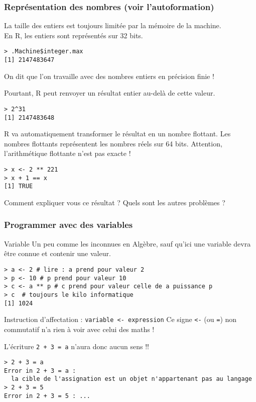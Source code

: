 \documentclass[10pt]{beamer}
\begin{document}
\begin{frame}[fragile]
  \frametitle{Représentation des nombres (voir l'autoformation)}
  \alert{La taille} des entiers \alert{est toujours limitée par} la mémoire de \alert{la machine}. \\
  En R, les entiers sont représentés sur 32 bits.
\begin{lstlisting}
> .Machine$integer.max
[1] 2147483647
\end{lstlisting}
On dit que l'on travaille avec des nombres entiers en \alert{précision finie} !

Pourtant, R peut renvoyer un résultat entier au-delà de cette valeur.
\begin{lstlisting}
> 2^31
[1] 2147483648
\end{lstlisting}
R va automatiquement transformer le résultat en un \alert{nombre flottant}.
Les nombres flottants représentent les nombres réels sur 64 bits.
Attention, l’arithmétique flottante n’est pas exacte !
\begin{lstlisting}
> x <- 2 ** 221
> x + 1 == x
[1] TRUE  
\end{lstlisting}
 Comment expliquer vous ce résultat ? Quels sont les autres problèmes ?
\end{frame}



\begin{frame}[fragile]
  \frametitle{Programmer avec des variables}
  \begin{alertblock}{Variable}
    Un peu comme les \alert{inconnues} en Algèbre, sauf qu'ici une variable devra être \alert{connue} et contenir une valeur.
  \end{alertblock}
      \begin{lstlisting}
> a <- 2 # lire : a prend pour valeur 2
> p <- 10 # p prend pour valeur 10
> c <- a ** p # c prend pour valeur celle de a puissance p
> c  # toujours le kilo informatique
[1] 1024 
\end{lstlisting}

\begin{alertblock}{Instruction d'affectation : \texttt{variable <- expression}}
  Ce signe \texttt{<-} (ou \texttt{=}) non commutatif n'a rien à voir avec celui des maths !
\end{alertblock}

\begin{exampleblock}{  L'écriture \texttt{2 + 3 = a} n'aura donc aucun sens !!}
\begin{lstlisting}[style=block]
> 2 + 3 = a
Error in 2 + 3 = a : 
  la cible de l'assignation est un objet n'appartenant pas au langage
> 2 + 3 = 5
Error in 2 + 3 = 5 : ...
\end{lstlisting}
\end{exampleblock}
\end{frame}
\end{document}
